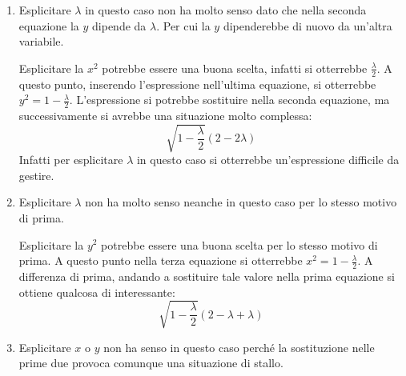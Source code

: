 \documentclass[a4paper]{article}
\begin{document}
	\begin{enumerate}
		\item Esplicitare $\lambda$ in questo caso non ha molto senso dato che nella seconda equazione la $y$ dipende da $\lambda$. Per cui la $y$ dipenderebbe di nuovo da un'altra variabile. 
		
		Esplicitare la $x^{2}$ potrebbe essere una buona scelta, infatti si otterrebbe $\frac{\lambda}{2}$. A questo punto, inserendo l'espressione nell'ultima equazione, si otterrebbe $y^{2} = 1-\frac{\lambda}{2}$. L'espressione si potrebbe sostituire nella seconda equazione, ma successivamente si avrebbe una situazione molto complessa:
		\begin{equation*}
			\sqrt{1-\dfrac{\lambda}{2}}\left(2-2\lambda\right)
		\end{equation*}
		Infatti per esplicitare $\lambda$ in questo caso si otterrebbe un'espressione difficile da gestire.


		\item Esplicitare $\lambda$ non ha molto senso neanche in questo caso per lo stesso motivo di prima.
		
		Esplicitare la $y^{2}$ potrebbe essere una buona scelta per lo stesso motivo di prima. A questo punto nella terza equazione si otterrebbe $x^{2}=1-\frac{\lambda}{2}$. A differenza di prima, andando a sostituire tale valore nella prima equazione si ottiene qualcosa di interessante:
		\begin{equation*}
			\sqrt{1-\dfrac{\lambda}{2}}\left(2-\lambda+\lambda\right)
		\end{equation*}
		
		
		\item Esplicitare $x$ o $y$ non ha senso in questo caso perché la sostituzione nelle prime due provoca comunque una situazione di stallo.
	\end{enumerate}
\end{document}
